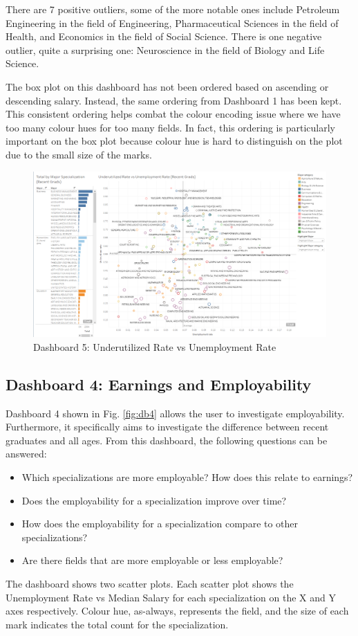 \documentclass[sigchi]{acmart}
\begin{document}
There are 7 positive outliers, some of the more notable ones include Petroleum Engineering in the field of Engineering, Pharmaceutical Sciences in the field of Health, and Economics in the field of Social Science. There is one negative outlier, quite a surprising one: Neuroscience in the field of Biology and Life Science.

The box plot on this dashboard has not been ordered based on ascending or descending salary. Instead, the same ordering from Dashboard 1 has been kept. This consistent ordering helps combat the colour encoding issue where we have too many colour hues for too many fields. In fact, this ordering is particularly important on the box plot because colour hue is hard to distinguish on the plot due to the small size of the marks.


  \begin{figure}[thpb]
  \includegraphics[width=1.0\textwidth]{DB5.png}
     \caption{Dashboard 5: Underutilized Rate vs Unemployment Rate}
         \label{fig:db5}
  \end{figure}


\subsection{Dashboard 4: Earnings and Employability}
\label{sec:db4}

Dashboard 4 shown in Fig. \ref{fig:db4} allows the user to investigate employability. Furthermore, it specifically aims to investigate the difference between recent graduates and all ages. From this dashboard, the following questions can be answered:
\begin{itemize}
\item{Which specializations are more employable? How does this relate to earnings?}
\item{Does the employability for a specialization improve over time?}
\item{How does the employability for a specialization compare to other specializations?}
\item{Are there fields that are more employable or less employable?}
\end{itemize}
The dashboard shows two scatter plots. Each scatter plot shows the Unemployment Rate vs Median Salary for each specialization on the X and Y axes respectively. Colour hue, as-always, represents the field, and the size of each mark indicates the total count for the specialization. 
\end{document}
